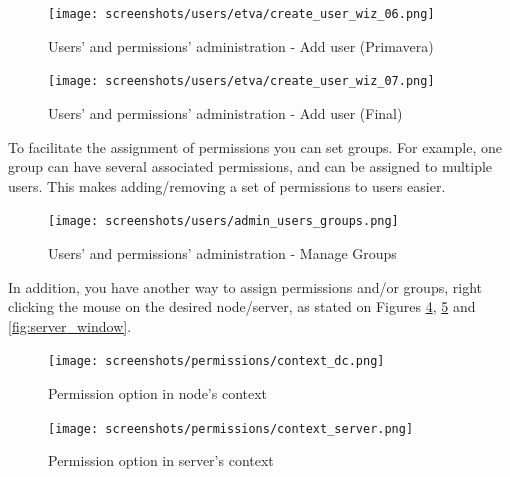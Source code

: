{\begin{figure}[H]
        \begin{center}
        \texttt{[image: screenshots/users/etva/create\_user\_wiz\_06.png]}
        \caption{Users' and permissions' administration - Add user (Primavera)}
        \label{fig:create_user_wiz_06}
        \end{center}
\end{figure}

\begin{figure}[H]
        \begin{center}
        \texttt{[image: screenshots/users/etva/create\_user\_wiz\_07.png]}
        \caption{Users' and permissions' administration - Add user (Final)}
        \label{fig:create_user_wiz_07}
        \end{center}
\end{figure}

}

To facilitate the assignment of permissions you can set groups. For example, one group can have several associated permissions, and can be assigned to multiple users. This makes adding/removing a set of permissions to users easier.

\begin{figure}[H]
        \begin{center}
        \texttt{[image: screenshots/users/admin\_users\_groups.png]}
        \caption{Users' and permissions' administration - Manage Groups}
        \label{fig:admin_users_groups}
        \end{center}
\end{figure}


In addition, you have another way to assign permissions and/or groups, right clicking the mouse on the desired node/server, as stated on Figures \ref{fig:context_dc}, \ref{fig:context_server} and \ref{fig:server_window}.

\begin{figure}[H]
        \begin{center}
        \texttt{[image: screenshots/permissions/context\_dc.png]}
        \caption{Permission option in node's context}
        \label{fig:context_dc}
        \end{center}
\end{figure}

\begin{figure}[H]
        \begin{center}
        \texttt{[image: screenshots/permissions/context\_server.png]}
        \caption{Permission option in server's context}
        \label{fig:context_server}
        \end{center}
\end{figure}

